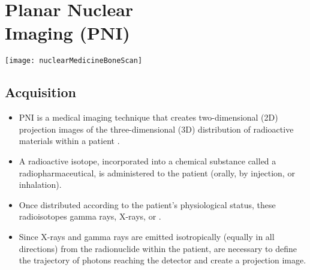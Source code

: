 \chapter{Planar Nuclear\\Imaging (PNI)}
\vspace{-51ex}
\begin{flushright}
\texttt{[image: nuclearMedicineBoneScan]} %
\end{flushright}


\section{Acquisition}
\begin{itemize}
\item \gls{PNI} is a medical imaging technique that
  creates two-dimensional (2D) projection images of the
  three-dimensional (3D) distribution of radioactive materials within
  a patient \cite{bushberg2011essential}.
\item A radioactive isotope, incorporated into a chemical substance
  called a radiopharmaceutical, is administered to the patient
  (orally, by injection, or inhalation).
\item Once distributed according to the patient's physiological
  status, these radioisotopes 
  gamma rays, X-rays, or .
\item Since X-rays and gamma rays are emitted isotropically (equally
  in all directions) from the radionuclide within the patient,
   are necessary to define the trajectory of photons
  reaching the detector and create a projection image.
\end{itemize}

